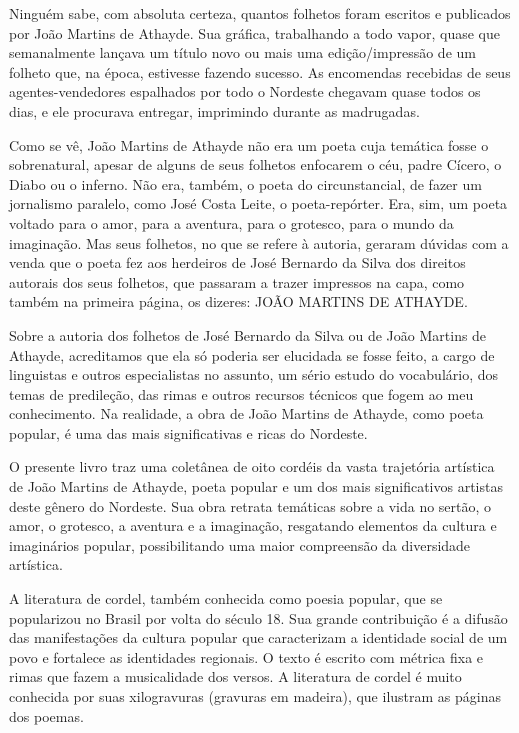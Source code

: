 \documentclass{extarticle}
\begin{document}
Ninguém sabe, com absoluta certeza, quantos folhetos foram escritos e
publicados por João Martins de Athayde. Sua gráfica, trabalhando a todo
vapor, quase que semanalmente lançava um título novo ou mais uma
edição/impressão de um folheto que, na época, estivesse fazendo sucesso.
As encomendas recebidas de seus agentes-vendedores espalhados por todo o
Nordeste chegavam quase todos os dias, e ele procurava entregar,
imprimindo durante as madrugadas.

Como se vê, João Martins de Athayde não era um poeta cuja temática fosse
o sobrenatural, apesar de alguns de seus folhetos enfocarem o céu, padre
Cícero, o Diabo ou o inferno. Não era, também, o poeta do
circunstancial, de fazer um jornalismo paralelo, como José Costa Leite,
o poeta-repórter. Era, sim, um poeta voltado para o amor, para a
aventura, para o grotesco, para o mundo da imaginação. Mas seus
folhetos, no que se refere à autoria, geraram dúvidas com a venda que o
poeta fez aos herdeiros de José Bernardo da Silva dos direitos autorais
dos seus folhetos, que passaram a trazer impressos na capa, como também
na primeira página, os dizeres: JOÃO MARTINS DE ATHAYDE.

Sobre a autoria dos folhetos de José Bernardo da Silva ou de João
Martins de Athayde, acreditamos que ela só poderia ser elucidada se
fosse feito, a cargo de linguistas e outros especialistas no assunto, um
sério estudo do vocabulário, dos temas de predileção, das rimas e outros
recursos técnicos que fogem ao meu conhecimento. Na realidade, a obra de
João Martins de Athayde, como poeta popular, é uma das mais
significativas e ricas do Nordeste.

O presente livro traz uma coletânea de oito cordéis da vasta trajetória
artística de João Martins de Athayde, poeta popular e um dos mais
significativos artistas deste gênero do Nordeste. Sua obra retrata
temáticas sobre a vida no sertão, o amor, o grotesco, a aventura e a
imaginação, resgatando elementos da cultura e imaginários popular,
possibilitando uma maior compreensão da diversidade artística.

A literatura de cordel, também conhecida como poesia popular, que se
popularizou no Brasil por volta do século 18. Sua grande contribuição é
a difusão das manifestações da cultura popular que caracterizam a
identidade social de um povo e fortalece as identidades regionais. O
texto é escrito com métrica fixa e rimas que fazem a musicalidade dos
versos. A literatura de cordel é muito conhecida por suas xilogravuras
(gravuras em madeira), que ilustram as páginas dos poemas.
\end{document}
